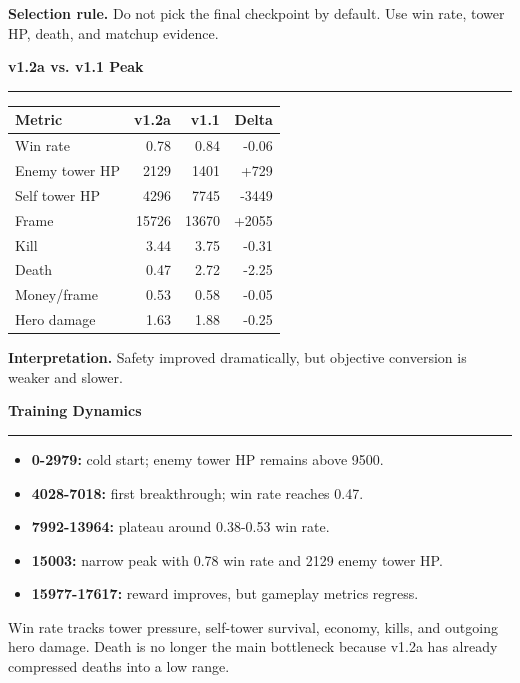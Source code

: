 \documentclass[final]{article}
\newcommand{\BlockTitle}[1]{%
  {\fontsize{35}{41}\selectfont\bfseries\color{ink}#1}\par
  \vspace{0.26cm}
  {\color{rule}\rule{\linewidth}{1.9pt}}\par
  \vspace{0.62cm}
}
\newcommand{\PosterBlock}[2]{%
  \begin{minipage}[t]{\linewidth}
    \BlockTitle{#1}
    {\fontsize{24}{31}\selectfont\color{ink}\RaggedRight #2}
  \end{minipage}
}
\begin{document}
\begin{minipage}[t]{70.4cm}
\begin{minipage}[t]{22.4cm}
{\vspace{0.72cm}
\textbf{Selection rule.} Do not pick the final checkpoint by default. Use win rate, tower HP, death, and matchup evidence.
}

\vspace{2.05cm}

\PosterBlock{v1.2a vs. v1.1 Peak}{
\begin{tabularx}{\linewidth}{>{\raggedright\arraybackslash}X r r r}
\toprule
\textbf{Metric} & \textbf{v1.2a} & \textbf{v1.1} & \textbf{Delta}\\
\midrule
Win rate & 0.78 & 0.84 & -0.06\\
Enemy tower HP & 2129 & 1401 & +729\\
Self tower HP & 4296 & 7745 & -3449\\
Frame & 15726 & 13670 & +2055\\
Kill & 3.44 & 3.75 & -0.31\\
Death & 0.47 & 2.72 & -2.25\\
Money/frame & 0.53 & 0.58 & -0.05\\
Hero damage & 1.63 & 1.88 & -0.25\\
\bottomrule
\end{tabularx}

\vspace{0.72cm}
\textbf{Interpretation.} Safety improved dramatically, but objective conversion is weaker and slower.
}
\end{minipage}
\hfill
\begin{minipage}[t]{21.8cm}
\PosterBlock{Training Dynamics}{
\begin{itemize}
  \item \textbf{0-2979:} cold start; enemy tower HP remains above 9500.
  \item \textbf{4028-7018:} first breakthrough; win rate reaches 0.47.
  \item \textbf{7992-13964:} plateau around 0.38-0.53 win rate.
  \item \textbf{15003:} narrow peak with 0.78 win rate and 2129 enemy tower HP.
  \item \textbf{15977-17617:} reward improves, but gameplay metrics regress.
\end{itemize}

\vspace{0.72cm}
Win rate tracks tower pressure, self-tower survival, economy, kills, and outgoing hero damage. Death is no longer the main bottleneck because v1.2a has already compressed deaths into a low range.
}


\end{minipage}
\end{minipage}
\end{document}
